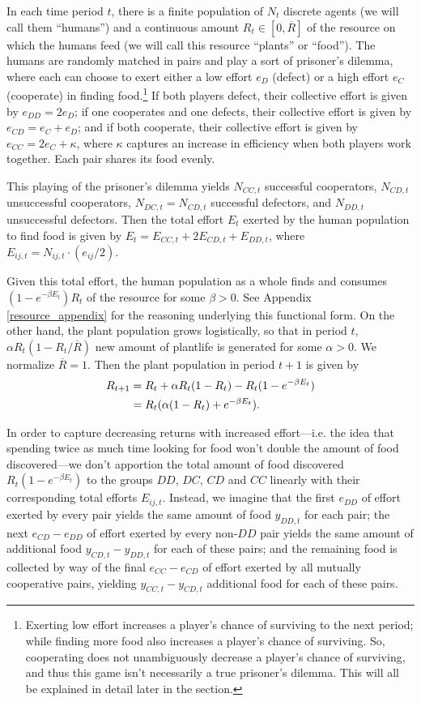 \documentclass[12pt,reqno]{amsart}
\begin{document}
In each time period $t$, there is a finite population of $N_t$ discrete agents (we will call them ``humans'') and a continuous amount $R_t \in [0,\overline{R}]$ of the resource on which the humans feed (we will call this resource ``plants'' or ``food''). The humans are randomly matched in pairs and play a sort of prisoner's dilemma, where each can choose to exert either a low effort $e_D$ (defect) or a high effort $e_C$ (cooperate) in finding food.\footnote{Exerting low effort increases a player's chance of surviving to the next period; while finding more food also increases a player's chance of surviving. So, cooperating does not unambiguously decrease a player's chance of surviving, and thus this game isn't necessarily a true prisoner's dilemma. This will all be explained in detail later in the section.} If both players defect, their collective effort is given by $e_{DD} = 2e_D$; if one cooperates and one defects, their collective effort is given by $e_{CD} = e_C + e_D$; and if both cooperate, their collective effort is given by $e_{CC} = 2e_C + \kappa$, where $\kappa$ captures an increase in efficiency when both players work together. Each pair shares its food evenly.

This playing of the prisoner's dilemma yields $N_{CC,t}$ successful cooperators, $N_{CD,t}$ unsuccessful cooperators, $N_{DC,t} = N_{CD,t}$ successful defectors, and $N_{DD,t}$ unsuccessful defectors. Then the total effort $E_t$ exerted by the human population to find food is given by $E_t = E_{CC,t} + 2E_{CD,t} + E_{DD,t}$, where $E_{ij,t} = N_{ij,t}\cdot(e_{ij}/2)$.

Given this total effort, the human population as a whole finds and consumes $(1-e^{-\beta E_t})R_t$ of the resource for some $\beta > 0$. See Appendix \ref{resource_appendix} for the reasoning underlying this functional form. On the other hand, the plant population grows logistically, so that in period $t$, $\alpha R_t(1-R_t/\overline{R})$ new amount of plantlife is generated for some $\alpha > 0$. We normalize $\overline{R} = 1$. Then the plant population in period $t+1$ is given by
\begin{align} \label{}
R_{t+1} &= R_t + \alpha R_t(1-R_t) - R_t(1-e^{-\beta E_t}) \notag\\
	     &= R_t(\alpha(1-R_t) + e^{-\beta E_t}).
\end{align}

In order to capture decreasing returns with increased effort---i.e. the idea that spending twice as much time looking for food won't double the amount of food discovered---we don't apportion the total amount of food discovered $R_t(1-e^{-\beta E_t})$ to the groups $DD$, $DC$, $CD$ and $CC$ linearly with their corresponding total efforts $E_{ij,t}$. Instead, we imagine that the first $e_{DD}$ of effort exerted by every pair yields the same amount of food $y_{DD,t}$ for each pair; the next $e_{CD}-e_{DD}$ of effort exerted by every non-$DD$ pair yields the same amount of additional food $y_{CD,t} - y_{DD,t}$ for each of these pairs; and the remaining food is collected by way of the final $e_{CC}-e_{CD}$ of effort exerted by all mutually cooperative pairs, yielding $y_{CC,t} - y_{CD,t}$ additional food for each of these pairs.
\end{document}
